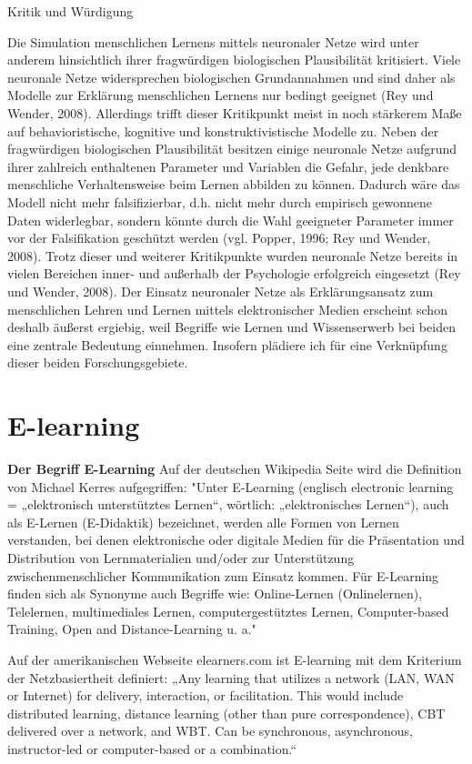 \documentclass[a4paper, 12pt, twoside, BCOR=20mm, DIV=calc, abstracton, parskip=half*, toc=bibliography, toc=listof, headsepline, footsepline, headings=small, numbers=enddot]{scrreprt}
\begin{document}
	Kritik und Würdigung
	
	Die Simulation menschlichen Lernens mittels neuronaler Netze wird unter anderem hinsichtlich ihrer fragwürdigen biologischen Plausibilität kritisiert. Viele neuronale Netze widersprechen biologischen Grundannahmen und sind daher als Modelle zur Erklärung menschlichen Lernens nur bedingt geeignet (Rey und Wender, 2008). Allerdings trifft dieser Kritikpunkt meist in noch stärkerem Maße auf behavioristische, kognitive und konstruktivistische Modelle zu. Neben der fragwürdigen biologischen Plausibilität besitzen einige neuronale Netze aufgrund ihrer zahlreich enthaltenen Parameter und Variablen die Gefahr, jede denkbare menschliche Verhaltensweise beim Lernen abbilden zu können. Dadurch wäre das Modell nicht mehr falsifizierbar, d.h. nicht mehr durch empirisch gewonnene Daten widerlegbar, sondern könnte durch die Wahl geeigneter Parameter immer vor der Falsifikation geschützt werden (vgl. Popper, 1996; Rey und Wender, 2008). Trotz dieser und weiterer Kritikpunkte wurden neuronale Netze bereits in vielen Bereichen inner- und außerhalb der Psychologie erfolgreich eingesetzt (Rey und Wender, 2008). Der Einsatz neuronaler Netze als Erklärungsansatz zum menschlichen Lehren und Lernen mittels elektronischer Medien erscheint schon deshalb äußerst ergiebig, weil Begriffe wie Lernen und Wissenserwerb bei beiden eine zentrale Bedeutung einnehmen. Insofern plädiere ich für eine Verknüpfung dieser beiden Forschungsgebiete.
	
	\section{E-learning}
	\textbf{Der Begriff E-Learning}
	Auf der deutschen Wikipedia Seite wird die Definition von Michael Kerres aufgegriffen:
	"Unter E-Learning (englisch electronic learning = „elektronisch unterstütztes Lernen“, wörtlich: „elektronisches Lernen“), auch als E-Lernen (E-Didaktik) bezeichnet, werden alle Formen von Lernen verstanden, bei denen elektronische oder digitale Medien für die Präsentation und Distribution von Lernmaterialien und/oder zur Unterstützung zwischenmenschlicher Kommunikation zum Einsatz kommen.
	Für E-Learning finden sich als Synonyme auch Begriffe wie: Online-Lernen (Onlinelernen), Telelernen, multimediales Lernen, computergestütztes Lernen, Computer-based Training, Open and Distance-Learning u. a."\cite{kerres2005learning}
	
	Auf der amerikanischen Webseite elearners.com  ist E-learning mit dem Kriterium der Netzbasiertheit definiert:
	„Any learning that utilizes a network (LAN, WAN or Internet) for delivery, interaction,
	or facilitation. This would include distributed learning, distance learning (other
	than pure correspondence), CBT delivered over a network, and WBT. Can be synchronous,
	asynchronous, instructor-led or computer-based or a combination.“\cite{aldrich2003simulations}
	
\end{document}
